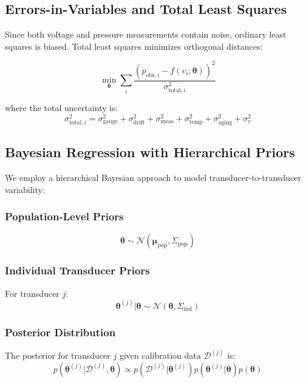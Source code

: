\documentclass[11pt]{article}
\begin{document}
\subsection{Errors-in-Variables and Total Least Squares}

Since both voltage and pressure measurements contain noise, ordinary least squares is biased. Total least squares minimizes orthogonal distances:

\begin{equation}
\min_{\bm{\theta}} \sum_i \frac{(p_{\text{obs},i} - f(v_i; \bm{\theta}))^2}{\sigma_{\text{total},i}^2}
\end{equation}

where the total uncertainty is:
\begin{equation}
\sigma_{\text{total},i}^2 = \sigma_{\text{gauge}}^2 + \sigma_{\text{drift}}^2 + \sigma_{\text{meas}}^2 + \sigma_{\text{temp}}^2 + \sigma_{\text{aging}}^2 + \sigma_v^2
\end{equation}

\subsection{Bayesian Regression with Hierarchical Priors}

We employ a hierarchical Bayesian approach to model transducer-to-transducer variability:

\subsubsection{Population-Level Priors}
\begin{equation}
\bm{\theta} \sim \mathcal{N}(\bm{\mu}_{\text{pop}}, \Sigma_{\text{pop}})
\end{equation}

\subsubsection{Individual Transducer Priors}
For transducer $j$:
\begin{equation}
\bm{\theta}^{(j)} | \bm{\theta} \sim \mathcal{N}(\bm{\theta}, \Sigma_{\text{ind}})
\end{equation}

\subsubsection{Posterior Distribution}
The posterior for transducer $j$ given calibration data $\mathcal{D}^{(j)}$ is:
\begin{equation}
p(\bm{\theta}^{(j)} | \mathcal{D}^{(j)}, \bm{\theta}) \propto p(\mathcal{D}^{(j)} | \bm{\theta}^{(j)}) p(\bm{\theta}^{(j)} | \bm{\theta}) p(\bm{\theta})
\end{equation}
\end{document}

